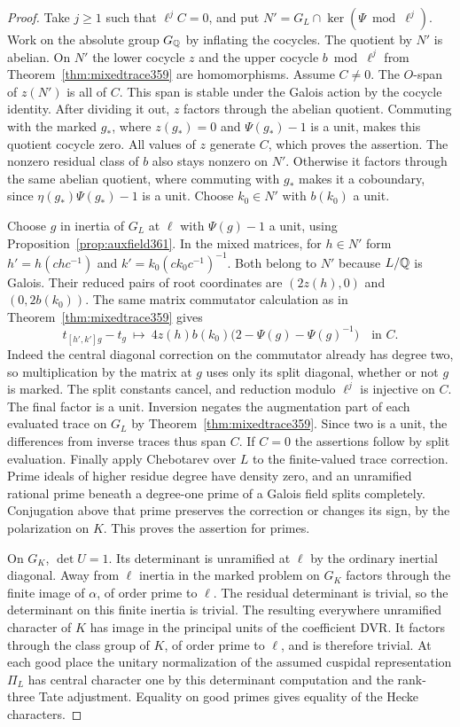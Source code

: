\documentclass[a4paper,11pt]{article}
\theoremstyle{definition}
\theoremstyle{remark}
\numberwithin{equation}{section}
\begin{document}
\begin{proof}
Take \(j\ge1\) such that \(\ell^jC=0\), and put
\(N'=G_L\cap\ker(\Psi\bmod\ell^j)\). Work on the absolute group \(G_\mathbb Q\) by inflating the cocycles.
The quotient by \(N'\) is abelian. On \(N'\) the lower cocycle
\(z\) and the upper cocycle \(b\bmod\ell^j\) from
Theorem~\ref{thm:mixedtrace359} are homomorphisms. Assume \(C\ne0\).
The \(O\)-span of \(z(N')\) is all of \(C\). This span is stable
under the Galois action by the cocycle identity. After dividing it
out, \(z\) factors through the abelian quotient. Commuting with
the marked \(g_*\), where \(z(g_*)=0\) and \(\Psi(g_*)-1\) is
a unit, makes this quotient cocycle zero. All values of \(z\)
generate \(C\), which proves the assertion. The nonzero residual
class of \(b\) also stays nonzero on \(N'\). Otherwise it factors
through the same abelian quotient, where commuting with \(g_*\)
makes it a coboundary, since \(\eta(g_*)\Psi(g_*)-1\) is a unit.
Choose \(k_0\in N'\) with \(b(k_0)\) a unit.

Choose \(g\) in inertia of \(G_L\) at \(\ell\) with
\(\Psi(g)-1\) a unit, using Proposition~\ref{prop:auxfield361}.
In the mixed matrices, for \(h\in N'\) form
\(h'=h(chc^{-1})\) and \(k'=k_0(ck_0c^{-1})^{-1}\). Both belong
to \(N'\) because \(L/\mathbb Q\) is Galois. Their reduced pairs
of root coordinates are \((2z(h),0)\) and \((0,2b(k_0))\).
The same matrix commutator calculation as in
Theorem~\ref{thm:mixedtrace359} gives
\[
 t_{[h',k']g}-t_g\ \longmapsto\
   4z(h)b(k_0)\bigl(2-\Psi(g)-\Psi(g)^{-1}\bigr)\quad\text{in }C.
\]
Indeed the central diagonal correction on the commutator already
has degree two, so multiplication by the matrix at \(g\) uses
only its split diagonal, whether or not \(g\) is marked.
The split constants cancel, and reduction modulo \(\ell^j\)
is injective on \(C\). The final factor is a unit. Inversion
negates the augmentation part of each evaluated trace on
\(G_L\) by Theorem~\ref{thm:mixedtrace359}. Since two is a unit,
the differences from inverse traces thus span \(C\). If \(C=0\)
the assertions follow by split evaluation. Finally apply
Chebotarev over \(L\) to the finite-valued trace correction.
Prime ideals of higher residue degree have density zero, and an
unramified rational prime beneath a degree-one prime of a
Galois field splits completely. Conjugation above that prime
preserves the correction or changes its sign, by the polarization
on \(K\). This proves the assertion for primes.

On \(G_K\), \(\det U=1\). Its determinant is unramified at
\(\ell\) by the ordinary inertial diagonal. Away from \(\ell\)
inertia in the marked problem on \(G_K\) factors through the
finite image of \(\alpha\), of order prime to \(\ell\).
The residual determinant is trivial, so the determinant on this
finite inertia is trivial. The resulting everywhere unramified
character of \(K\) has image in the principal units of the
coefficient DVR. It factors through the class group of \(K\),
of order prime to \(\ell\), and is therefore trivial. At each
good place the unitary normalization of the assumed cuspidal
representation \(\Pi_L\) has central character one by this
determinant computation and the rank-three Tate adjustment.
Equality on good primes gives equality of the Hecke characters.


\end{proof}
\end{document}
